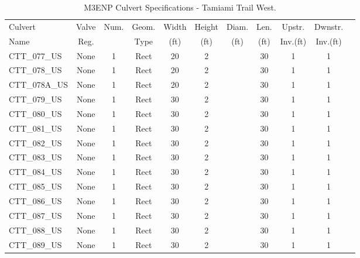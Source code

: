 \begin{table}[]
\caption{M3ENP Culvert Specifications - Tamiami Trail West.}
\label{tab:culv-specs-CTT}
\begin{tabular}{@{}lcccccccccc@{}}
\toprule
Culvert       & Valve      & Num.     & Geom.& Width  & Height & Diam.    & Len.   & Upstr.    & Dwnstr.    \\
Name          & Reg.       &          & Type & (ft)   & (ft)   & (ft)     & (ft)   & Inv.(ft)  & Inv.(ft)   \\
\midrule
CTT\_077\_US  & None       & 1        & Rect & 20     & 2     &          & 30     & 1         & 1          \\
CTT\_078\_US  & None       & 1        & Rect & 20     & 2     &          & 30     & 1         & 1          \\
CTT\_078A\_US & None       & 1        & Rect & 20     & 2     &          & 30     & 1         & 1          \\
CTT\_079\_US  & None       & 1        & Rect & 30     & 2      &          & 30     & 1         & 1          \\
CTT\_080\_US  & None       & 1        & Rect & 30     & 2     &          & 30     & 1         & 1          \\
CTT\_081\_US  & None       & 1        & Rect & 30     & 2     &          & 30     & 1         & 1          \\
CTT\_082\_US  & None       & 1        & Rect & 30     & 2     &          & 30     & 1         & 1          \\
CTT\_083\_US  & None       & 1        & Rect & 30     & 2     &          & 30     & 1         & 1          \\
CTT\_084\_US  & None       & 1        & Rect & 30     & 2     &          & 30     & 1         & 1          \\
CTT\_085\_US  & None       & 1        & Rect & 30     & 2     &          & 30     & 1         & 1          \\
CTT\_086\_US  & None       & 1        & Rect & 30     & 2     &          & 30     & 1         & 1          \\
CTT\_087\_US  & None       & 1        & Rect & 30     & 2     &          & 30     & 1         & 1          \\
CTT\_088\_US  & None       & 1        & Rect & 30     & 2     &          & 30     & 1         & 1          \\
CTT\_089\_US  & None       & 1        & Rect & 30     & 2     &          & 30     & 1         & 1          \\

\end{tabular}
\end{table}
